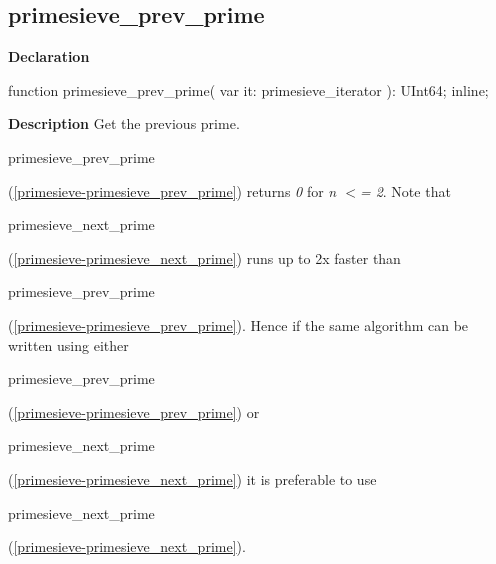 \documentclass{report}
\newif\ifpdf
\begin{document}
\subsection*{primesieve{\_}prev{\_}prime}
\fi
\label{primesieve-primesieve_prev_prime}
\begin{list}{}{
\setlength{\itemindent}{0cm}
\setlength{\listparindent}{0cm}
\setlength{\leftmargin}{\evensidemargin}
\addtolength{\leftmargin}{\tmplength}
\settowidth{\labelsep}{X}
\addtolength{\leftmargin}{\labelsep}
\setlength{\labelwidth}{\tmplength}
}
\item[\textbf{Declaration}\hfill]
\ifpdf
\begin{flushleft}
\fi
\begin{ttfamily}
function primesieve{\_}prev{\_}prime( var it: primesieve{\_}iterator ): UInt64; inline;\end{ttfamily}

\ifpdf
\end{flushleft}
\fi

\par
\item[\textbf{Description}]
Get the previous prime.

\begin{ttfamily}primesieve{\_}prev{\_}prime\end{ttfamily}(\ref{primesieve-primesieve_prev_prime}) returns \textit{0} for \textit{n {$<$}= 2}. Note that \begin{ttfamily}primesieve{\_}next{\_}prime\end{ttfamily}(\ref{primesieve-primesieve_next_prime}) runs up to 2x faster than \begin{ttfamily}primesieve{\_}prev{\_}prime\end{ttfamily}(\ref{primesieve-primesieve_prev_prime}). Hence if the same algorithm can be written using either \begin{ttfamily}primesieve{\_}prev{\_}prime\end{ttfamily}(\ref{primesieve-primesieve_prev_prime}) or \begin{ttfamily}primesieve{\_}next{\_}prime\end{ttfamily}(\ref{primesieve-primesieve_next_prime}) it is preferable to use \begin{ttfamily}primesieve{\_}next{\_}prime\end{ttfamily}(\ref{primesieve-primesieve_next_prime}).

\end{list}
\end{document}
